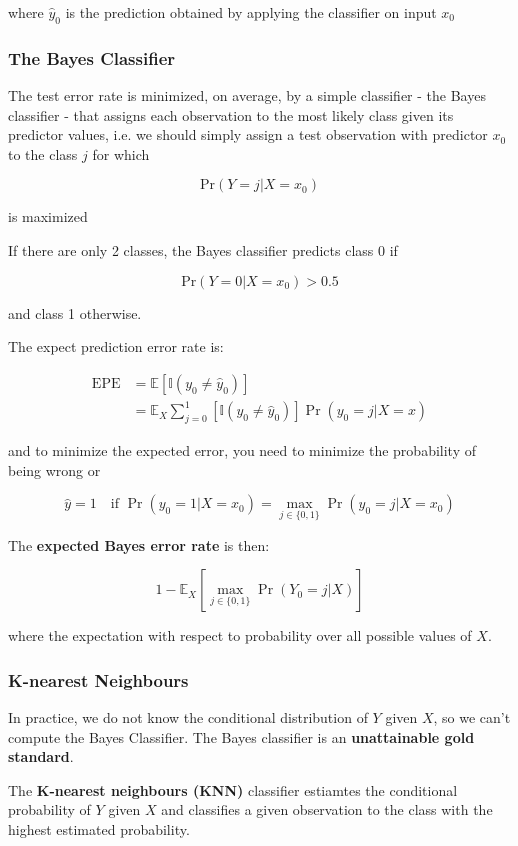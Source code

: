 \documentclass[11pt]{article}
\begin{document}
where $\hat{y}_0$ is the prediction obtained by applying the classifier on input $x_0$

\subsubsection{The Bayes Classifier}
The test error rate is minimized, on average, by a simple classifier - the Bayes classifier - that assigns each observation to the most likely class given its predictor values, i.e. we should simply assign a test observation with predictor $x_0$ to the class $j$ for which

\[\text{Pr}(Y = j | X = x_0)\]

is maximized

If there are only 2 classes, the Bayes classifier predicts class 0 if

\[\text{Pr}(Y=0|X=x_0) > 0.5\]

and class 1 otherwise.

The expect prediction error rate is:

\begin{align}
    \text{EPE} &= \mathbb{E}[\mathbb{I}(y_0 \neq \hat{y}_0)] \nonumber \\
    &= \mathbb{E}_X \sum_{j=0}^{1} \left[ \mathbb{I}(y_0 \neq \hat{y}_0) \right] \Pr(y_0 = j|X = x)
\end{align}

and to minimize the expected error, you need to minimize the probability of being wrong or

\[\hat{y} = 1 \quad \text{if  } \Pr(y_0 = 1|X=x_0) = \max_{j \in \{ 0,1 \}} \Pr(y_0 = j|X = x_0)\]

The \textbf{expected Bayes error rate} is then:

\[1 - \mathbb{E}_X [\max_{j \in \{ 0,1 \}} \Pr(Y_0 = j|X)]\]

where the expectation with respect to probability over all possible values of $X$.

\subsubsection{K-nearest Neighbours}
In practice, we do not know the conditional distribution of $Y$ given $X$, so we can't compute the Bayes Classifier. The Bayes classifier is an \textbf{unattainable gold standard}.

The \textbf{K-nearest neighbours (KNN)} classifier estiamtes the conditional probability of $Y$ given $X$ and classifies a given observation to the class with the highest estimated probability.
\end{document}
